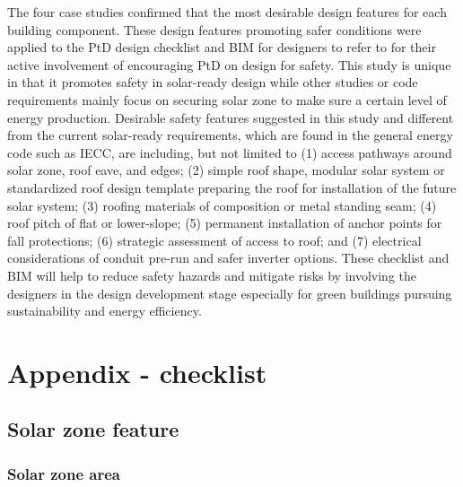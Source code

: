 \documentclass[]{article}
\begin{document}
The four case studies confirmed that the most desirable design features
for each building component. These design features promoting safer
conditions were applied to the PtD design checklist and BIM for
designers to refer to for their active involvement of encouraging PtD on
design for safety. This study is unique in that it promotes safety in
solar-ready design while other studies or code requirements mainly focus
on securing solar zone to make sure a certain level of energy
production. Desirable safety features suggested in this study and
different from the current solar-ready requirements, which are found in
the general energy code such as IECC, are including, but not limited to
(1) access pathways around solar zone, roof eave, and edges; (2) simple
roof shape, modular solar system or standardized roof design template
preparing the roof for installation of the future solar system; (3)
roofing materials of composition or metal standing seam; (4) roof pitch
of flat or lower-slope; (5) permanent installation of anchor points for
fall protections; (6) strategic assessment of access to roof; and (7)
electrical considerations of conduit pre-run and safer inverter options.
These checklist and BIM will help to reduce safety hazards and mitigate
risks by involving the designers in the design development stage
especially for green buildings pursuing sustainability and energy
efficiency.

\hypertarget{appendix---checklist}{%
\section{Appendix - checklist}\label{appendix---checklist}}

\hypertarget{solar-zone-feature}{%
\subsection{Solar zone feature}\label{solar-zone-feature}}

\hypertarget{solar-zone-area}{%
\subsubsection{Solar zone area}\label{solar-zone-area}}
\end{document}
